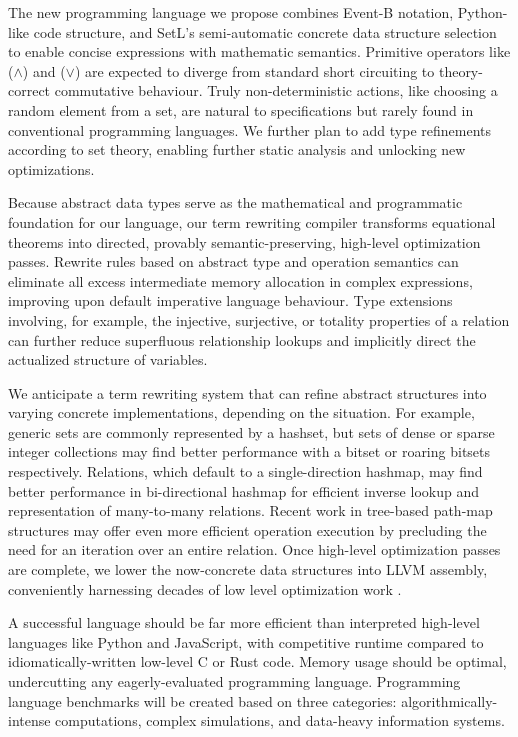 \documentclass[12pt]{article}
\begin{document}
The new programming language we propose combines Event-B notation, Python-like code structure, and SetL's semi-automatic concrete data structure selection to enable concise expressions with mathematic semantics. Primitive operators like ($\land$) and ($\lor$) are expected to diverge from standard short circuiting to theory-correct commutative behaviour. Truly non-deterministic actions, like choosing a random element from a set, are natural to specifications but rarely found in conventional programming languages. We further plan to add type refinements according to set theory, enabling further static analysis and unlocking new optimizations.

Because abstract data types serve as the mathematical and programmatic foundation for our language, our term rewriting compiler transforms equational theorems into directed, provably semantic-preserving, high-level optimization passes. Rewrite rules based on abstract type and operation semantics can eliminate all excess intermediate memory allocation in complex expressions, improving upon default imperative language behaviour. Type extensions involving, for example, the injective, surjective, or totality properties of a relation can further reduce superfluous relationship lookups and implicitly direct the actualized structure of variables.

We anticipate a term rewriting system that can refine abstract structures into varying concrete implementations, depending on the situation. For example, generic sets are commonly represented by a hashset, but sets of dense or sparse integer collections may find better performance with a bitset or roaring bitsets respectively. Relations, which default to a single-direction hashmap, may find better performance in bi-directional hashmap for efficient inverse lookup and representation of many-to-many relations. Recent work in tree-based path-map structures \cite{jones2024triemapsmatch} may offer even more efficient operation execution by precluding the need for an iteration over an entire relation. Once high-level optimization passes are complete, we lower the now-concrete data structures into LLVM assembly, conveniently harnessing decades of low level optimization work \cite{lattner2002llvm}.

A successful language should be far more efficient than interpreted high-level languages like Python and JavaScript, with competitive runtime compared to idiomatically-written low-level C or Rust code. Memory usage should be optimal, undercutting any eagerly-evaluated programming language. Programming language benchmarks will be created based on three categories: algorithmically-intense computations, complex simulations, and data-heavy information systems.
\end{document}
